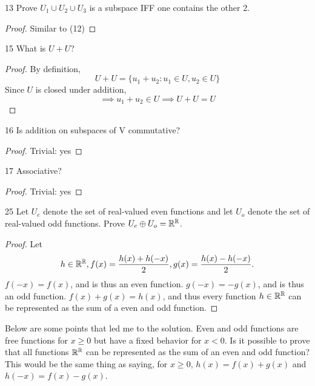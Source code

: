 \documentclass[12pt, letterpaper]{article}
\begin{document}
\begin{problem}{13}
Prove $U_1\cup U_2\cup U_3$ is a subspace IFF one contains the other 2.
\end{problem}
\begin{proof}
Similar to (12)
\end{proof}

\begin{problem}{15}
What is $U+U$?
\end{problem}
\begin{proof}
By definition,
$$U+U=\{u_1+u_2:u_1\in U,u_2\in U\}$$
Since $U$ is closed under addition,
$$\implies u_1+u_2\in U \implies U+U=U$$
\end{proof}

\begin{problem}{16}
Is addition on subspaces of V commutative?
\end{problem}
\begin{proof}
Trivial: yes
\end{proof}

\begin{problem}{17}
Associative?
\end{problem}
\begin{proof}
Trivial: yes
\end{proof}

\begin{problem}{25}
Let $U_e$ denote the set of real-valued even functions
and let $U_o$ denote the set of real-valued odd functions.
Prove $U_e\oplus U_o=\mathbb{R}^{\mathbb{R}}$.
\end{problem}
\begin{proof}
Let 
$$h\in\mathbb{R}^{\mathbb{R}},f(x)=\frac{h(x)+h(-x)}{2},g(x)=\frac{h(x)-h(-x)}{2}.$$
$f(-x)=f(x)$, and is thus an even function.
$g(-x)=-g(x)$, and is thus an odd function.
$f(x)+g(x)=h(x)$, and thus every function $h\in\mathbb{R}^{\mathbb{R}}$ can be represented as the sum of a even and odd function.
\end{proof}
Below are some points that led me to the solution.
Even and odd functions are free functions for $x\geq0$ but have a fixed behavior for $x<0$.
Is it possible to prove that all functions $\mathbb{R}^{\mathbb{R}}$ can be represented as the sum of an even and odd function?
This would be the same thing as saying, for $x\geq0$, $h(x)=f(x)+g(x)$ and $h(-x)=f(x)-g(x)$.
\end{document}
